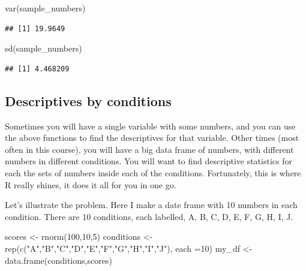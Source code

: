 \documentclass[
]{book}
\newenvironment{Shaded}{\begin{snugshade}}{\end{snugshade}}
\newcommand{\AttributeTok}[1]{\textcolor[rgb]{0.77,0.63,0.00}{#1}}
\newcommand{\DecValTok}[1]{\textcolor[rgb]{0.00,0.00,0.81}{#1}}
\newcommand{\FunctionTok}[1]{\textcolor[rgb]{0.00,0.00,0.00}{#1}}
\newcommand{\NormalTok}[1]{#1}
\newcommand{\OtherTok}[1]{\textcolor[rgb]{0.56,0.35,0.01}{#1}}
\newcommand{\StringTok}[1]{\textcolor[rgb]{0.31,0.60,0.02}{#1}}
\begin{document}
\begin{Shaded}
\begin{Highlighting}[]
\FunctionTok{var}\NormalTok{(sample\_numbers)}
\end{Highlighting}
\end{Shaded}

\begin{verbatim}
## [1] 19.9649
\end{verbatim}

\begin{Shaded}
\begin{Highlighting}[]
\FunctionTok{sd}\NormalTok{(sample\_numbers)}
\end{Highlighting}
\end{Shaded}

\begin{verbatim}
## [1] 4.468209
\end{verbatim}

\hypertarget{descriptives-by-conditions}{%
\subsection{Descriptives by conditions}\label{descriptives-by-conditions}}

Sometimes you will have a single variable with some numbers, and you can use the above functions to find the descriptives for that variable. Other times (most often in this course), you will have a big data frame of numbers, with different numbers in different conditions. You will want to find descriptive statistics for each the sets of numbers inside each of the conditions. Fortunately, this is where R really shines, it does it all for you in one go.

Let's illustrate the problem. Here I make a date frame with 10 numbers in each condition. There are 10 conditions, each labelled, A, B, C, D, E, F, G, H, I, J.

\begin{Shaded}
\begin{Highlighting}[]
\NormalTok{scores }\OtherTok{\textless{}{-}} \FunctionTok{rnorm}\NormalTok{(}\DecValTok{100}\NormalTok{,}\DecValTok{10}\NormalTok{,}\DecValTok{5}\NormalTok{)}
\NormalTok{conditions }\OtherTok{\textless{}{-}} \FunctionTok{rep}\NormalTok{(}\FunctionTok{c}\NormalTok{(}\StringTok{"A"}\NormalTok{,}\StringTok{"B"}\NormalTok{,}\StringTok{"C"}\NormalTok{,}\StringTok{"D"}\NormalTok{,}\StringTok{"E"}\NormalTok{,}\StringTok{"F"}\NormalTok{,}\StringTok{"G"}\NormalTok{,}\StringTok{"H"}\NormalTok{,}\StringTok{"I"}\NormalTok{,}\StringTok{"J"}\NormalTok{), }\AttributeTok{each =}\DecValTok{10}\NormalTok{)}
\NormalTok{my\_df }\OtherTok{\textless{}{-}} \FunctionTok{data.frame}\NormalTok{(conditions,scores)}
\end{Highlighting}
\end{Shaded}
\end{document}
